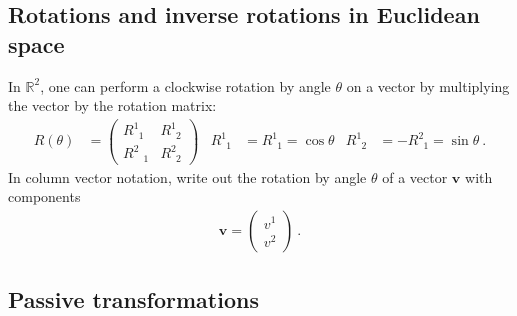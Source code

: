 \documentclass[12pt]{article}
\numberwithin{equation}{section}    %
\renewcommand{\vec}[1]{\mathbf{#1}} %
\begin{document}

\subsection{Rotations and inverse rotations in Euclidean space}

In $\mathbb{R}^2$, one can perform a clockwise rotation by angle $\theta$ on a vector by multiplying the vector by the rotation matrix:
\begin{align}
	R(\theta) & = 
	\begin{pmatrix}
		R^1_{\phantom{1}1} & R^1_{\phantom{1}2}
		\\
		R^2_{\phantom{21}1} & R^2_{\phantom{2}2}
	\end{pmatrix}
	&
	R^1_{\phantom{1}1} &= R^1_{\phantom{1}1} = \cos\theta
	&
	R^1_{\phantom{1}2} &= - R^2_{\phantom{2}1} = \sin \theta \ .
\end{align}
In column vector notation, write out the rotation by angle $\theta$ of a vector $\vec{v}$ with components
\begin{align}
	\vec{v} = \begin{pmatrix}
		v^1 \\ v^2
	\end{pmatrix} \ .
\end{align}

\subsection{Passive transformations}
\end{document}

